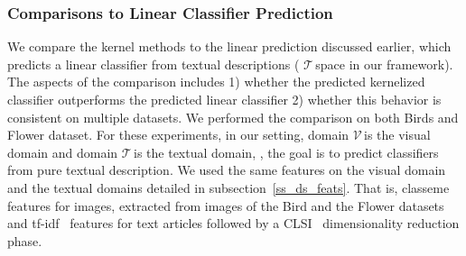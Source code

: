 



\subsubsection{Comparisons to Linear Classifier Prediction}
\label{exp1}
 We compare the kernel methods to the linear prediction discussed earlier,  which predicts a linear classifier from textual descriptions  ( \small$\mathcal{T}\,$\normalsize space in our framework). The aspects of the comparison includes  1) whether the predicted kernelized classifier outperforms the predicted linear classifier  2) whether this behavior is consistent on multiple datasets. We performed the comparison on both Birds and Flower dataset.  For these experiments, in our setting, domain \small$\mathcal{V}\,$\normalsize is the visual domain and domain \small$\mathcal{T}\,$\normalsize is the textual domain, \ie, the goal is to predict classifiers from pure textual description. We used the same features on the visual domain  and the textual domains detailed in subsection~\ref{ss_ds_feats}. That is,  classeme features \cite{classemes} for images, extracted from images of the Bird and the Flower datasets and tf-idf~\cite{salton1988term} features for text articles followed by a CLSI~\cite{clsi05} dimensionality reduction phase. %
 
